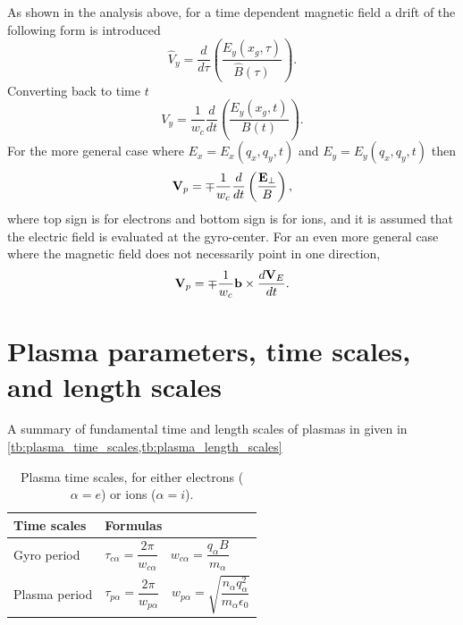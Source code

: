 \documentclass[oneside,a4paper,11pt]{report}
\begin{document}
As shown in the analysis above, for a time dependent magnetic field a drift of the following form is introduced
\begin{equation}
    \hat{V}_y = \frac{d}{d\tau} \left ( \frac{\hat{E}_y(\hat{x}_g,\tau)}{\hat{B}(\tau)} \right ).
\end{equation}
Converting back to time $t$
\begin{equation}
    V_y = \frac{1}{w_c} \frac{d}{dt} \left ( \frac{E_y(x_g,t)}{B(t)} \right ).
\end{equation}
For the more general case where $E_x = E_x(q_x,q_y,t)$ and $E_y = E_y(q_x,q_y,t)$ then
\begin{equation}
    \mathbf{V}_p = \mp \frac{1}{w_c} \frac{d}{dt} \left ( \frac{\mathbf{E}_\perp}{B} \right ),
\end{equation}
where top sign is for electrons and bottom sign is for ions, and it is assumed that the electric field is evaluated at the gyro-center. For an even more general case where the magnetic field does not necessarily point in one direction,
\begin{equation}
    \mathbf{V}_p = \mp \frac{1}{w_c} \mathbf{b} \times \frac{d\mathbf{V}_E}{dt}.
\end{equation}

\chapter{Plasma parameters, time scales, and length scales}
A summary of fundamental time and length scales of plasmas in given in \cref{tb:plasma_time_scales,tb:plasma_length_scales}
\begin{table}[H]
\renewcommand{\arraystretch}{2.5}
\centering
\caption{Plasma time scales, for either electrons ($\alpha = e$) or ions ($\alpha = i$). }
\label{tb:plasma_time_scales}
 \begin{tabular}{l|l}
    Time scales & Formulas \\
    \hline
    Gyro period  & $\tau_{c\alpha} = \dfrac{2\pi}{w_{c\alpha}} \quad w_{c\alpha} = \dfrac{q_\alpha B}{m_\alpha}$ \\
    Plasma period & $\tau_{p\alpha} = \dfrac{2 \pi }{w_{p\alpha}} \quad w_{p\alpha} = \sqrt{\dfrac{n_\alpha q_\alpha^2}{m_\alpha \epsilon_0}}$
 \end{tabular}
\end{table}
\end{document}
